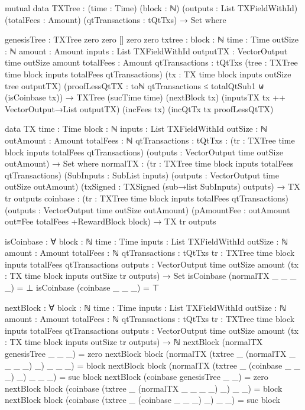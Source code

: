 \documentclass{beamer}
\begin{document}
\begin{code}
    mutual
      data TXTree : (time : Time) (block : ℕ)
        (outputs : List TXFieldWithId)
        (totalFees : Amount)
        (qtTransactions : tQtTxs) → Set where

        genesisTree : TXTree zero zero [] zero zero
        txtree      :
          {block : ℕ} {time : Time}
          {outSize : ℕ} {amount : Amount}
          {inputs : List TXFieldWithId}
          {outputTX : VectorOutput time outSize amount}
          {totalFees : Amount} {qtTransactions : tQtTxs}
          (tree : TXTree time block inputs totalFees qtTransactions)
          (tx : TX {time} {block} {inputs} {outSize} tree outputTX)
          (proofLessQtTX :
              toℕ qtTransactions ≤ totalQtSub1
              ⊎
              (isCoinbase tx))
          → TXTree (sucTime time)
            (nextBlock tx)
            (inputsTX tx ++ VectorOutput→List outputTX)
            (incFees tx) (incQtTx tx proofLessQtTX)

      data TX {time : Time} {block : ℕ} {inputs : List TXFieldWithId}
          {outSize : ℕ} {outAmount : Amount}
          {totalFees : ℕ} {qtTransactions : tQtTxs}
        : (tr : TXTree time block inputs totalFees qtTransactions)
          (outputs : VectorOutput time outSize outAmount) → Set where
        normalTX :
          (tr : TXTree time block inputs totalFees qtTransactions)
          (SubInputs : SubList inputs)
          (outputs : VectorOutput time outSize outAmount)
          (txSigned : TXSigned (sub→list SubInputs) outputs)
          → TX tr outputs
        coinbase :
          (tr : TXTree time block inputs totalFees qtTransactions)
          (outputs : VectorOutput time outSize outAmount)
          (pAmountFee : outAmount out≡Fee totalFees +RewardBlock block)
          → TX tr outputs

      isCoinbase : ∀ {block : ℕ} {time : Time}
        {inputs : List TXFieldWithId}
        {outSize : ℕ} {amount : Amount}
        {totalFees : ℕ} {qtTransactions : tQtTxs}
        {tr : TXTree time block inputs totalFees qtTransactions}
        {outputs : VectorOutput time outSize amount}
        (tx : TX {time} {block} {inputs} {outSize} tr outputs)
        → Set
      isCoinbase (normalTX _ _ _ _) = ⊥
      isCoinbase (coinbase _ _ _)     = ⊤

      nextBlock : ∀ {block : ℕ} {time : Time}
        {inputs : List TXFieldWithId}
        {outSize : ℕ} {amount : Amount}
        {totalFees : ℕ} {qtTransactions : tQtTxs}
        {tr : TXTree time block inputs totalFees qtTransactions}
        {outputs : VectorOutput time outSize amount}
        (tx : TX {time} {block} {inputs} {outSize} tr outputs)
        → ℕ
      nextBlock (normalTX genesisTree _ _ _) = zero
      nextBlock {block} (normalTX (txtree _ (normalTX _ _ _ _) _) _ _ _) = block
      nextBlock {block} (normalTX (txtree _ (coinbase _ _ _) _) _ _ _) = suc block
      nextBlock (coinbase genesisTree _ _) = zero
      nextBlock {block} (coinbase (txtree _ (normalTX _ _ _ _) _) _ _) = block
      nextBlock {block} (coinbase (txtree _ (coinbase _ _ _) _) _ _) = suc block


\end{code}
\end{document}
